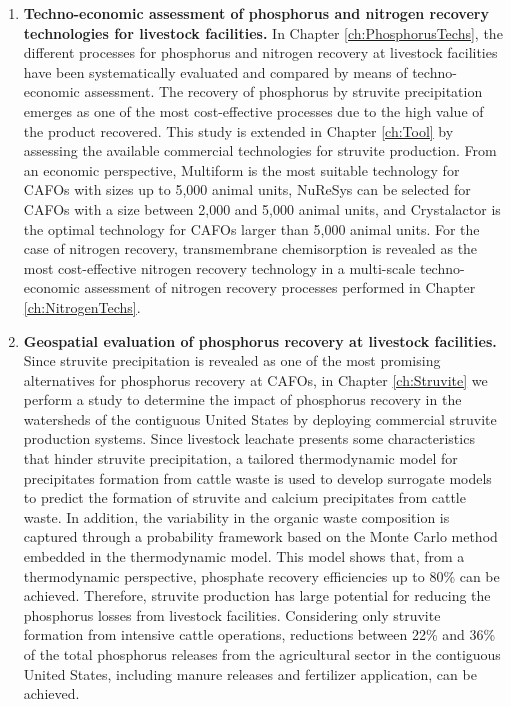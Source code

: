 \begin{enumerate}[font=\bfseries]
	\item \textbf{Techno-economic assessment of phosphorus and nitrogen recovery technologies for livestock facilities.} In Chapter \ref{ch:PhosphorusTechs}, the different processes for phosphorus and nitrogen recovery at livestock facilities have been systematically evaluated and compared by means of techno-economic assessment. The recovery of phosphorus by struvite precipitation
	emerges as one of the most cost-effective processes due to the high value of the product recovered. This study is extended in Chapter \ref{ch:Tool} by assessing the available commercial technologies for struvite production. From an economic perspective, Multiform is the most suitable technology for CAFOs with sizes up to 5,000 animal units, NuReSys can be selected for CAFOs with a size between 2,000 and 5,000 animal units, and Crystalactor is the optimal technology for CAFOs larger than 5,000 animal units.
	For the case of nitrogen recovery, transmembrane chemisorption is revealed as the most cost-effective nitrogen recovery technology in a multi-scale techno-economic assessment of nitrogen recovery processes performed in Chapter \ref{ch:NitrogenTechs}. 
	
	\item \textbf{Geospatial evaluation of phosphorus recovery at livestock facilities.} Since struvite precipitation is revealed as one of the most promising alternatives for phosphorus recovery at CAFOs, in Chapter \ref{ch:Struvite} we perform a study to determine the impact of phosphorus recovery in the watersheds of the contiguous United States by deploying commercial struvite production systems. Since  livestock leachate 	presents some characteristics that hinder struvite precipitation, a tailored thermodynamic model for precipitates formation from cattle waste is used to develop surrogate
	models to predict the formation of struvite and calcium precipitates from cattle waste. In addition, the variability in the organic waste composition is captured through a probability framework based on the Monte Carlo method embedded in the thermodynamic model. This model shows that, from a thermodynamic perspective, phosphate recovery efficiencies up to 80\% can be achieved. Therefore, struvite production has large potential for reducing the phosphorus losses from livestock facilities. Considering only struvite formation from intensive cattle operations, reductions between 22\% and 36\% of the total phosphorus releases from the 	agricultural sector in the contiguous United States, including manure releases and fertilizer application, can be achieved.
	

\end{enumerate}
